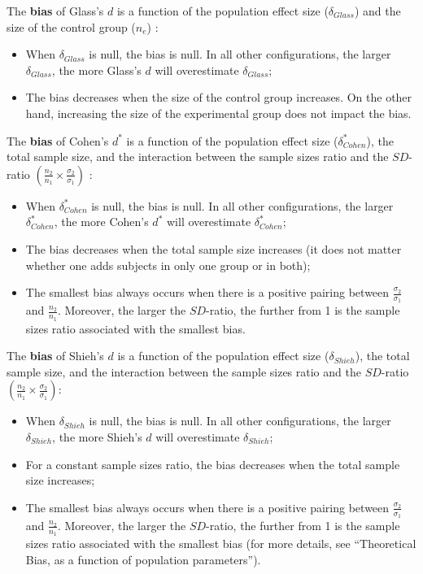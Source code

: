 \documentclass[
  english,
  man,mask,floatsintext]{apa6}
\providecommand{\tightlist}{%
  \setlength{\itemsep}{0pt}\setlength{\parskip}{0pt}}
\begin{document}
The \textbf{bias} of Glass's \(d\) is a function of the population effect size (\(\delta_{Glass}\)) and the size of the control group (\(n_e\)) :

\begin{itemize}
\tightlist
\item
  When \(\delta_{Glass}\) is null, the bias is null. In all other configurations, the larger \(\delta_{Glass}\), the more Glass's \(d\) will overestimate \(\delta_{Glass}\);\\
\item
  The bias decreases when the size of the control group increases. On the other hand, increasing the size of the experimental group does not impact the bias.
\end{itemize}

The \textbf{bias} of Cohen's \(d^*\) is a function of the population effect size (\(\delta^*_{Cohen}\)), the total sample size, and the interaction between the sample sizes ratio and the \(SD\)-ratio \(\left(\frac{n_2}{n_1}\times\frac{\sigma_2}{\sigma_1} \right)\) :

\begin{itemize}
\tightlist
\item
  When \(\delta^*_{Cohen}\) is null, the bias is null. In all other configurations, the larger \(\delta^*_{Cohen}\), the more Cohen's \(d^*\) will overestimate \(\delta^*_{Cohen}\);\\
\item
  The bias decreases when the total sample size increases (it does not matter whether one adds subjects in only one group or in both);
\item
  The smallest bias always occurs when there is a positive pairing between \(\frac{\sigma_2}{\sigma_1}\) and \(\frac{n_2}{n_1}\). Moreover, the larger the \(SD\)-ratio, the further from 1 is the sample sizes ratio associated with the smallest bias.
\end{itemize}

The \textbf{bias} of Shieh's \(d\) is a function of the population effect size (\(\delta_{Shieh}\)), the total sample size, and the interaction between the sample sizes ratio and the \(SD\)-ratio \(\left(\frac{n_2}{n_1}\times\frac{\sigma_2}{\sigma_1} \right)\):

\begin{itemize}
\tightlist
\item
  When \(\delta_{Shieh}\) is null, the bias is null. In all other configurations, the larger \(\delta_{Shieh}\), the more Shieh's \(d\) will overestimate \(\delta_{Shieh}\);\\
\item
  For a constant sample sizes ratio, the bias decreases when the total sample size increases;\\
\item
  The smallest bias always occurs when there is a positive pairing between \(\frac{\sigma_2}{\sigma_1}\) and \(\frac{n_2}{n_1}\). Moreover, the larger the \(SD\)-ratio, the further from 1 is the sample sizes ratio associated with the smallest bias (for more details, see ``Theoretical Bias, as a function of population parameters'').
\end{itemize}
\end{document}
